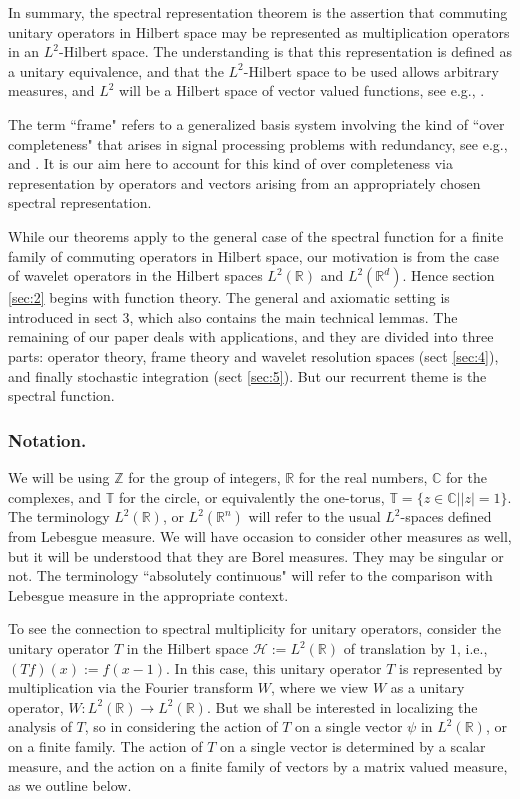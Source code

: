 \documentclass{birkmult}
\theoremstyle{definition}
\theoremstyle{remark}
\numberwithin{equation}{section}
\begin{document}
       In summary, the spectral representation theorem is the assertion 
that commuting unitary operators in Hilbert space may be represented as 
multiplication operators in an $L^{2}$-Hilbert space. The understanding 
is that this representation is defined as a unitary equivalence, and 
that the $L^{2}$-Hilbert space to be used allows arbitrary measures, and 
$L^{2}$ will be a Hilbert space of vector valued functions, 
see e.g., \cite{Hel86}.

      The term ``frame" refers to a generalized basis system involving the 
kind of ``over completeness" that arises in signal processing problems 
with redundancy, see e.g., \cite{BCHL06, CKS06} and \cite{Chr03}. It is our 
aim here to account for this kind of over completeness via representation 
by operators and vectors arising from an appropriately chosen spectral 
representation. 

      While our theorems apply to the general case of the spectral function 
for a finite family of commuting operators in Hilbert space, our motivation 
is from the case of wavelet operators in the Hilbert spaces 
$L^{2}(\mathbb{R})$ and $L^{2}(\mathbb{R}^{d})$. Hence section \ref{sec:2} 
begins with function theory. The general and axiomatic setting is introduced 
in sect 3, which also contains the main technical lemmas. The remaining of 
our paper deals with applications, and they are divided into three parts: 
operator theory, frame theory and wavelet resolution spaces 
(sect \ref{sec:4}), and finally stochastic integration (sect \ref{sec:5}). 
But our recurrent theme is the spectral function.


\subsubsection*{Notation.} We will be using $\mathbb{Z}$ for the group of 
integers, $\mathbb{R}$ for the real numbers, $\mathbb{C}$ for the 
complexes, and $\mathbb{T}$ for the circle, or equivalently the 
one-torus, $\mathbb{T} = \{z \in \mathbb{C}| |z| = 1\}$. The terminology 
$L^{2}(\mathbb{R})$, or $L^{2}(\mathbb{R}^{n})$ will refer to the usual 
$L^{2}$-spaces defined from Lebesgue measure. We will have occasion to 
consider other measures as well, but it will be understood that they are 
Borel measures. They may be singular or not. The terminology ``absolutely 
continuous" will refer to the comparison with Lebesgue measure in the 
appropriate context. 

      To see the connection to spectral multiplicity for unitary operators, 
consider the unitary operator $T$ in the Hilbert space 
$\mathcal{H}:= L^{2}(\mathbb{R})$ of translation by $1$, i.e., 
$(Tf)(x) := f(x - 1)$. In this case, this unitary operator $T$ is 
represented by multiplication via the Fourier transform $W$, where we view 
$W$ as a unitary operator, $W : L^{2}(\mathbb{R}) \to L^{2}(\mathbb{R})$. 
But we shall be interested in localizing the analysis of $T$, so in 
considering the action of $T$ on a single vector $\psi$ in 
$L^{2}(\mathbb{R})$, or on a finite family. The action of $T$ on a single 
vector is determined by a scalar measure, and the action on a finite family 
of vectors by a matrix valued measure, as we outline below.   
\end{document}

